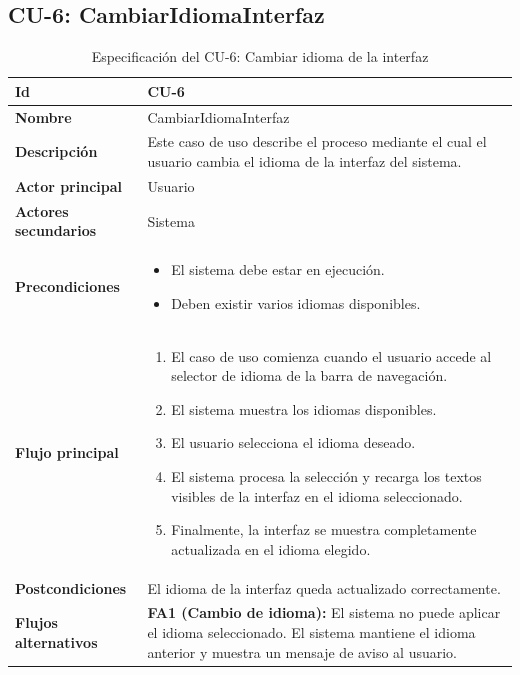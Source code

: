     \newpage
    
    \subsection{CU-6: CambiarIdiomaInterfaz}
\begin{longtable}{|p{4cm}|p{10cm}|}
\caption{Especificación del CU-6: Cambiar idioma de la interfaz}
\label{tab:esp_cu6}\\
\hline
\textbf{Id} & CU-6 \\ \hline
\textbf{Nombre} & CambiarIdiomaInterfaz \\ \hline

\textbf{Descripción} & 
Este caso de uso describe el proceso mediante el cual el usuario cambia el idioma de la interfaz del sistema. \\ \hline

\textbf{Actor principal} & Usuario \\ \hline
\textbf{Actores secundarios} & Sistema \\ \hline

\textbf{Precondiciones} & 
\begin{itemize}
    \item El sistema debe estar en ejecución.
    \item Deben existir varios idiomas disponibles.
\end{itemize} \\ \hline

\textbf{Flujo principal} & 
\begin{enumerate}
    \item El caso de uso comienza cuando el usuario accede al selector de idioma de la barra de navegación.
    
    \item El sistema muestra los idiomas disponibles.
    
    \item El usuario selecciona el idioma deseado.
    
    \item El sistema procesa la selección y recarga los textos visibles de la interfaz en el idioma seleccionado.
    
    \item Finalmente, la interfaz se muestra completamente actualizada en el idioma elegido.
\end{enumerate} \\ \hline

\textbf{Postcondiciones} & 
El idioma de la interfaz queda actualizado correctamente. \\ \hline

\textbf{Flujos alternativos} & 
\textbf{FA1 (Cambio de idioma):} El sistema no puede aplicar el idioma seleccionado. El sistema mantiene el idioma anterior y muestra un mensaje de aviso al usuario. \\ \hline

\end{longtable}
    \newpage
